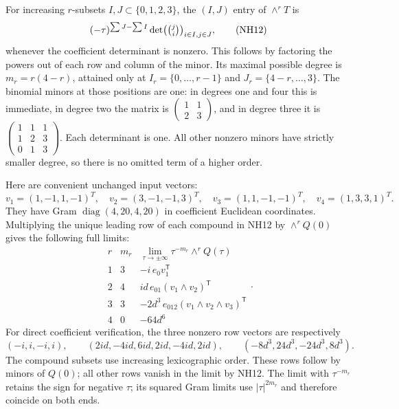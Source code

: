 \documentclass[11pt]{article}
\newcommand{\diag}{\operatorname{diag}}
\begin{document}
For increasing $r$-subsets $I,J\subset\{0,1,2,3\}$, the
$(I,J)$ entry of $\wedge^rT$ is
\[
 (-\tau)^{\sum J-\sum I}
       \det\bigl(\tbinom j i\bigr)_{i\in I,j\in J},
 \tag{NH12}
\]
whenever the coefficient determinant is nonzero. This follows
by factoring the powers out of each row and column of the
minor. Its maximal possible degree is
$m_r=r(4-r)$, attained only at
$I_r=\{0,\ldots,r-1\}$ and $J_r=\{4-r,\ldots,3\}$.
The binomial minors at those positions are one: in degrees
one and four this is immediate, in degree two the matrix is
$\left(\begin{smallmatrix}1&1\\2&3\end{smallmatrix}\right)$,
and in degree three it is
$\left(\begin{smallmatrix}1&1&1\\1&2&3\\0&1&3\end{smallmatrix}\right)$.
Each determinant is one. All other nonzero minors have strictly
smaller degree, so there is no omitted term of a higher order.

Here are convenient unchanged input vectors:
\[
 v_1=(1,-1,1,-1)^T,\quad v_2=(3,-1,-1,3)^T,\quad
 v_3=(1,1,-1,-1)^T,\quad v_4=(1,3,3,1)^T.
 \tag{NH13}
\]
They have Gram $\diag(4,20,4,20)$ in coefficient Euclidean
coordinates. Multiplying the unique leading row of each compound
in NH12 by $\wedge^rQ(0)$ gives the following full limits:
\[
\begin{array}{c|c|c}
 r&m_r&\lim_{\tau\to\pm\infty}\tau^{-m_r}\wedge^rQ(\tau)\\\hline
 1&3&-i\,e_0v_1^{\mathsf T}\\
 2&4&id\,e_{01}(v_1\wedge v_2)^{\mathsf T}\\
 3&3&-2d^3\,e_{012}(v_1\wedge v_2\wedge v_3)^{\mathsf T}\\
 4&0&-64d^6
\end{array}.
\tag{NH14}
\]
For direct coefficient verification, the three nonzero row
vectors are respectively
\[
 (-i,i,-i,i),\qquad
 (2id,-4id,6id,2id,-4id,2id),\qquad
 (-8d^3,24d^3,-24d^3,8d^3).
\]
The compound subsets use increasing lexicographic order. These
rows follow by minors of $Q(0)$; all other rows vanish in the
limit by NH12. The limit with $\tau^{-m_r}$ retains the sign
for negative $\tau$; its squared Gram limits use $|\tau|^{2m_r}$
and therefore coincide on both ends.
\end{document}
